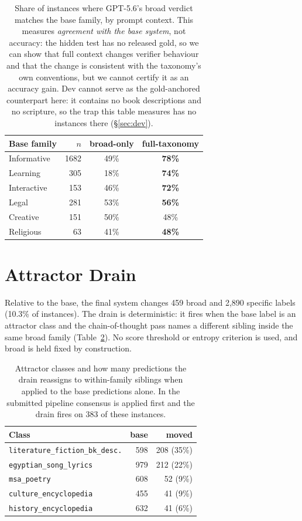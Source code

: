 \documentclass[11pt]{article}
\begin{document}
\begin{table}[h]
\centering\small
\begin{tabular}{lrcc}
\toprule
Base family & $n$ & broad-only & full-taxonomy \\
\midrule
Informative & 1682 & 49\% & \textbf{78\%} \\
Learning    &  305 & 18\% & \textbf{74\%} \\
Interactive &  153 & 46\% & \textbf{72\%} \\
Legal       &  281 & 53\% & \textbf{56\%} \\
Creative    &  151 & 50\% & 48\% \\
Religious   &   63 & 41\% & \textbf{48\%} \\
\bottomrule
\end{tabular}
\caption{Share of instances where GPT-5.6's broad verdict matches the base family, by
prompt context. This measures \emph{agreement with the base system}, not accuracy: the hidden
test has no released gold, so we can show that full context changes verifier behaviour and
that the change is consistent with the taxonomy's own conventions, but we cannot certify it as
an accuracy gain. Dev cannot serve as the gold-anchored counterpart here: it contains no
book descriptions and no scripture, so the trap this table measures has no instances there
(\S\ref{sec:dev}).}
\label{tab:trap}
\end{table}

\section{Attractor Drain}
\label{app:drain}
Relative to the base, the final system changes 459 broad and 2{,}890 specific labels (10.3\% of
instances). The drain is deterministic: it fires when the base label is an attractor class and
the chain-of-thought pass names a different sibling inside the same broad family
(Table~\ref{tab:drain}). No score threshold or entropy criterion is used, and
broad is held fixed by construction.

\begin{table}[h]
\centering\footnotesize
\setlength{\tabcolsep}{4pt}
\begin{tabular}{lrr}
\toprule
Class & base & moved \\
\midrule
\texttt{literature\_fiction\_bk\_desc.} & 598 & 208 (35\%) \\
\texttt{egyptian\_song\_lyrics}          & 979 & 212 (22\%) \\
\texttt{msa\_poetry}                     & 608 &  52 (9\%) \\
\texttt{culture\_encyclopedia}           & 455 &  41 (9\%) \\
\texttt{history\_encyclopedia}           & 632 &  41 (6\%) \\
\bottomrule
\end{tabular}
\caption{Attractor classes and how many predictions the drain reassigns to within-family
siblings when applied to the base predictions alone. In the submitted pipeline consensus is
applied first and the drain fires on 383 of these instances.}
\label{tab:drain}
\end{table}
\end{document}
